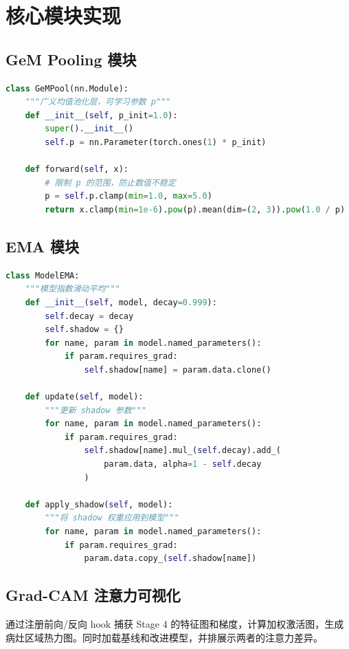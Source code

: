 \documentclass[12pt,a4paper]{report}
\begin{document}
\section{核心模块实现}

\subsection{GeM Pooling 模块}

\begin{lstlisting}[language=Python, caption=GeM Pooling 实现代码]
class GeMPool(nn.Module):
    """广义均值池化层，可学习参数 p"""
    def __init__(self, p_init=1.0):
        super().__init__()
        self.p = nn.Parameter(torch.ones(1) * p_init)

    def forward(self, x):
        # 限制 p 的范围，防止数值不稳定
        p = self.p.clamp(min=1.0, max=5.0)
        return x.clamp(min=1e-6).pow(p).mean(dim=(2, 3)).pow(1.0 / p)
\end{lstlisting}

\subsection{EMA 模块}

\begin{lstlisting}[language=Python, caption=EMA 实现代码]
class ModelEMA:
    """模型指数滑动平均"""
    def __init__(self, model, decay=0.999):
        self.decay = decay
        self.shadow = {}
        for name, param in model.named_parameters():
            if param.requires_grad:
                self.shadow[name] = param.data.clone()

    def update(self, model):
        """更新 shadow 参数"""
        for name, param in model.named_parameters():
            if param.requires_grad:
                self.shadow[name].mul_(self.decay).add_(
                    param.data, alpha=1 - self.decay
                )

    def apply_shadow(self, model):
        """将 shadow 权重应用到模型"""
        for name, param in model.named_parameters():
            if param.requires_grad:
                param.data.copy_(self.shadow[name])
\end{lstlisting}

\subsection{Grad-CAM 注意力可视化}

通过注册前向/反向 hook 捕获 Stage 4 的特征图和梯度，计算加权激活图，生成病灶区域热力图。同时加载基线和改进模型，并排展示两者的注意力差异。
\end{document}
